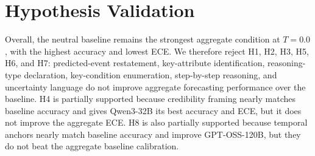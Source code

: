 \documentclass[11pt]{article}
\begin{document}
\section{Hypothesis Validation}
\label{app:hypothesis_validation}

\begin{table}[H]
\centering
{}
\caption{Hypothesis validation summary at $T=0.0$ using forecasting summaries, averaged across Qwen2.5-7B-Instruct, Qwen3-32B, and GPT-OSS-120B.}
\label{tab:hypothesis_validation}
\end{table}

Overall, the neutral baseline remains the strongest aggregate condition at $T=0.0$, with the highest accuracy and lowest ECE.
We therefore reject H1, H2, H3, H5, H6, and H7: predicted-event restatement, key-attribute identification, reasoning-type declaration, key-condition enumeration, step-by-step reasoning, and uncertainty language do not improve aggregate forecasting performance over the baseline.
H4 is partially supported because credibility framing nearly matches baseline accuracy and gives Qwen3-32B its best accuracy and ECE, but it does not improve the aggregate ECE.
H8 is also partially supported because temporal anchors nearly match baseline accuracy and improve GPT-OSS-120B, but they do not beat the aggregate baseline calibration.



\end{document}
